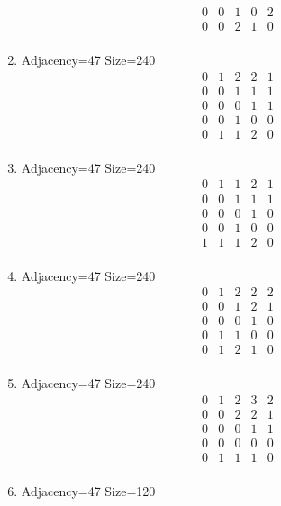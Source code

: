 \documentclass[12pt]{article}
\begin{document}
\begin{multicols}{3}
\begin{enumerate}
\begin{equation*}
\begin{array}{ccccc}
0&0&1&0&2\\
0&0&2&1&0\\
\end{array}
\end{equation*}
\item Adjacency=47 Size=240
\begin{equation*}
\begin{array}{ccccc}
0&1&2&2&1\\
0&0&1&1&1\\
0&0&0&1&1\\
0&0&1&0&0\\
0&1&1&2&0\\
\end{array}
\end{equation*}
\item Adjacency=47 Size=240
\begin{equation*}
\begin{array}{ccccc}
0&1&1&2&1\\
0&0&1&1&1\\
0&0&0&1&0\\
0&0&1&0&0\\
1&1&1&2&0\\
\end{array}
\end{equation*}
\item Adjacency=47 Size=240
\begin{equation*}
\begin{array}{ccccc}
0&1&2&2&2\\
0&0&1&2&1\\
0&0&0&1&0\\
0&1&1&0&0\\
0&1&2&1&0\\
\end{array}
\end{equation*}
\item Adjacency=47 Size=240
\begin{equation*}
\begin{array}{ccccc}
0&1&2&3&2\\
0&0&2&2&1\\
0&0&0&1&1\\
0&0&0&0&0\\
0&1&1&1&0\\
\end{array}
\end{equation*}
\item Adjacency=47 Size=120
\begin{equation*}
\begin{array}{ccccc}

\end{array}
\end{equation*}
\end{enumerate}
\end{multicols}
\end{document}
